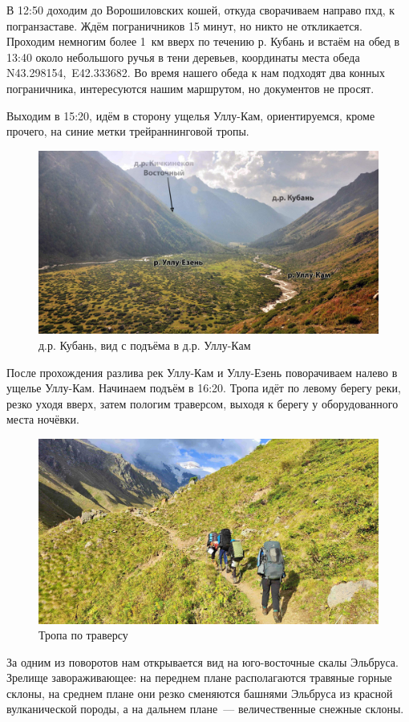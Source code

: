 В 12:50 доходим до Ворошиловских кошей, откуда сворачиваем направо пхд, к погранзаставе. Ждём пограничников 15 минут, но никто не откликается. Проходим немногим более 1~км вверх по течению р. Кубань и встаём на обед в 13:40 около небольшого ручья в тени деревьев, координаты места обеда N43.298154\degree,~E42.333682\degree. Во время нашего обеда к нам подходят два конных пограничника, интересуются нашим маршрутом, но документов не просят.

Выходим в 15:20, идём в сторону ущелья Уллу-Кам, ориентируемся, кроме прочего, на синие метки трейраннинговой тропы.

\begin{figure}[h!]
	\centering
	\includegraphics[width=0.7\linewidth]{../pics/DSC_0464 2.JPG}
	\caption{д.р. Кубань, вид с подъёма в д.р. Уллу-Кам}
	\label{fig:DSC_0464 2.JPG}
\end{figure}

После прохождения разлива рек Уллу-Кам и Уллу-Езень поворачиваем налево в ущелье Уллу-Кам. Начинаем подъём в 16:20. Тропа идёт по левому берегу реки, резко уходя вверх, затем пологим траверсом, выходя к берегу у оборудованного места ночёвки.


\begin{figure}[h!]
	\centering
	\includegraphics[width=0.7\linewidth]{../pics/IMG_20240829_170756.jpg}
	\caption{Тропа по траверсу}
	\label{fig:IMG_20240829_170756.jpg}
\end{figure}

За одним из поворотов нам открывается вид на юго-восточные скалы Эльбруса. Зрелище завораживающее: на переднем плане располагаются травяные горные склоны, на среднем плане они резко сменяются башнями Эльбруса из красной вулканической породы, а на дальнем плане~--- величественные снежные склоны.

